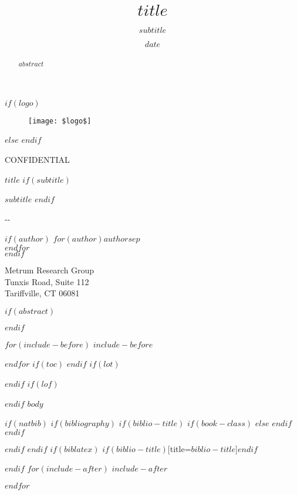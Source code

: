 \documentclass[$if(fontsize)$$fontsize$,$endif$$if(lang)$$lang$,$endif$$if(papersize)$$papersize$,$endif$$for(classoption)$$classoption$$sep$,$endfor$]{$documentclass$}
\title{$title$}
\title{}
\subtitle{$subtitle$}
\author{}
\date{$date$}
\date{}
\newcommand{\todaymetrum}{\the\year-\twodigit{\month}-\twodigit{\day}}
\newcommand{\doctitle}{$title$}
\newcommand{\scientist}{$for(author)$$author$$sep$ \\ $endfor$}
\begin{document}
\begin{center}
$if(logo)$
\begin{figure}[H]
\centering
\texttt{[image: \$logo\$]}
\end{figure}
$else$
\vspace{1cm}
$endif$
\vspace{1cm}

{\Large CONFIDENTIAL}
\vspace{3.0cm}

{\huge \doctitle}
$if(subtitle)$
\par
{\large $subtitle$}
$endif$

\vspace{1cm}

\todaymetrum

\vspace{6cm}


$if(author)$
\scientist \\
$endif$

Metrum Research Group\\
Tunxis Road, Suite 112\\
Tariffville, CT 06081\\
\end{center}


\newpage


$if(abstract)$
\begin{abstract}
$abstract$
\end{abstract}
$endif$

$for(include-before)$
$include-before$

$endfor$
$if(toc)$
{
\hypersetup{linkcolor=$if(toccolor)$$toccolor$$else$black$endif$}
\setcounter{tocdepth}{$toc-depth$}
\tableofcontents
}
$endif$
$if(lot)$
\listoftables
$endif$
$if(lof)$
\listoffigures
$endif$
$body$

$if(natbib)$
$if(bibliography)$
$if(biblio-title)$
$if(book-class)$
\renewcommand\bibname{$biblio-title$}
$else$
\renewcommand\refname{$biblio-title$}
$endif$
$endif$


$endif$
$endif$
$if(biblatex)$
\printbibliography$if(biblio-title)$[title=$biblio-title$]$endif$

$endif$
$for(include-after)$
$include-after$

$endfor$
\end{document}
